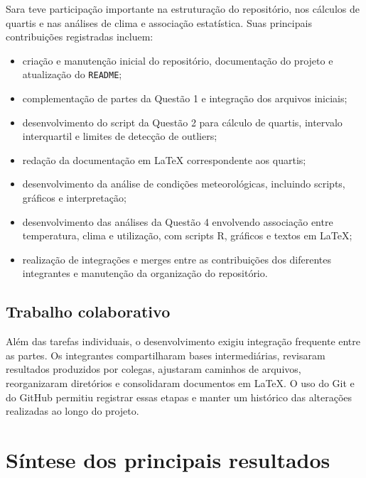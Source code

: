 \documentclass[12pt,oneside,a4paper,english,brazil]{abntex2}
\begin{document}
Sara teve participação importante na estruturação do repositório, nos cálculos de quartis e nas análises de clima e associação estatística. Suas principais contribuições registradas incluem:

\begin{itemize}[leftmargin=1.2cm]
\item criação e manutenção inicial do repositório, documentação do projeto e atualização do \texttt{README};
\item complementação de partes da Questão 1 e integração dos arquivos iniciais;
\item desenvolvimento do script da Questão 2 para cálculo de quartis, intervalo interquartil e limites de detecção de outliers;
\item redação da documentação em LaTeX correspondente aos quartis;
\item desenvolvimento da análise de condições meteorológicas, incluindo scripts, gráficos e interpretação;
\item desenvolvimento das análises da Questão 4 envolvendo associação entre temperatura, clima e utilização, com scripts R, gráficos e textos em LaTeX;
\item realização de integrações e merges entre as contribuições dos diferentes integrantes e manutenção da organização do repositório.
\end{itemize}

\section{Trabalho colaborativo}

Além das tarefas individuais, o desenvolvimento exigiu integração frequente entre as partes. Os integrantes compartilharam bases intermediárias, revisaram resultados produzidos por colegas, ajustaram caminhos de arquivos, reorganizaram diretórios e consolidaram documentos em LaTeX. O uso do Git e do GitHub permitiu registrar essas etapas e manter um histórico das alterações realizadas ao longo do projeto.

\chapter{Síntese dos principais resultados}
\end{document}
